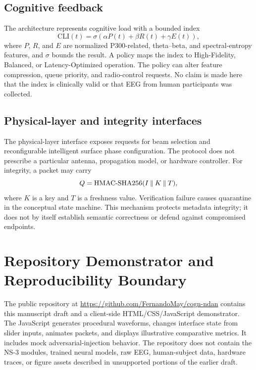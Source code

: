 \documentclass{BVP_CINC}
\newcommand{\RI}{reconfigurable intelligent surface}
\begin{document}
\subsection{Cognitive feedback}
The architecture represents cognitive load with a bounded index
\begin{equation}
 \mathrm{CLI}(t)=\sigma\left(\alpha P(t)+\beta R(t)+\gamma E(t)\right),
\end{equation}
where $P$, $R$, and $E$ are normalized P300-related, theta--beta, and spectral-entropy features, and $\sigma$ bounds the result. A policy maps the index to High-Fidelity, Balanced, or Latency-Optimized operation. The policy can alter feature compression, queue priority, and radio-control requests. No claim is made here that the index is clinically valid or that EEG from human participants was collected.

\subsection{Physical-layer and integrity interfaces}
The physical-layer interface exposes requests for beam selection and \RI{} phase configuration. The protocol does not prescribe a particular antenna, propagation model, or hardware controller. For integrity, a packet may carry
\begin{equation}
 Q=\mathrm{HMAC\mathchar`-SHA256}(I\mathbin\Vert K\mathbin\Vert T),
\end{equation}
where $K$ is a key and $T$ is a freshness value. Verification failure causes quarantine in the conceptual state machine. This mechanism protects metadata integrity; it does not by itself establish semantic correctness or defend against compromised endpoints.

\section{Repository Demonstrator and Reproducibility Boundary}
The public repository at \url{https://github.com/FernandoMay/cogn-ndan} contains this manuscript draft and a client-side HTML/CSS/JavaScript demonstrator. The JavaScript generates procedural waveforms, changes interface state from slider inputs, animates packets, and displays illustrative comparative metrics. It includes mock adversarial-injection behavior. The repository does not contain the NS-3 modules, trained neural models, raw EEG, human-subject data, hardware traces, or figure assets described in unsupported portions of the earlier draft.
\end{document}
